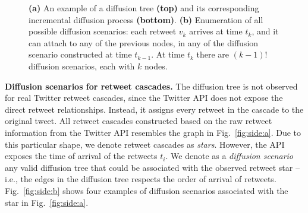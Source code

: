 \begin{figure*}[tbp]
	\newcommand\mywidth{0.5}
	\newcommand\myheight{0.2}
	\centering



	\caption{
		\textbf{(a)} An example of a diffusion tree \textbf{(top)} and its corresponding incremental diffusion process \textbf{(bottom)}.
		\textbf{(b)} Enumeration of all possible diffusion scenarios:
		each retweet $v_k$ arrives at time $t_k$, and it can attach to any of the previous nodes, in any of the diffusion scenario constructed at time $t_{k-1}$.
		At time $t_k$ there are $(k-1)!$ diffusion scenarios, each with $k$ nodes.
	}
\end{figure*}

\textbf{Diffusion scenarios for retweet cascades.}
The diffusion tree is not observed for real Twitter retweet cascades, since the Twitter API does not expose the direct retweet relationships.
Instead, it assigns every retweet in the cascade to the original tweet.
All retweet cascades constructed based on the raw retweet information from the Twitter API resembles the graph in Fig.~\ref{fig:side:a}.
Due to this particular shape, we denote retweet cascades as \emph{stars}.
However, the API exposes the time of arrival of the retweets $t_i$.
We denote as a \emph{diffusion scenario} any valid diffusion tree that could be associated with the observed retweet star -- i.e., the edges in the diffusion tree respects the order of arrival of retweets.
Fig.~\ref{fig:side:b} shows four examples of diffusion scenarios associated with the star in Fig.~\ref{fig:side:a}.


